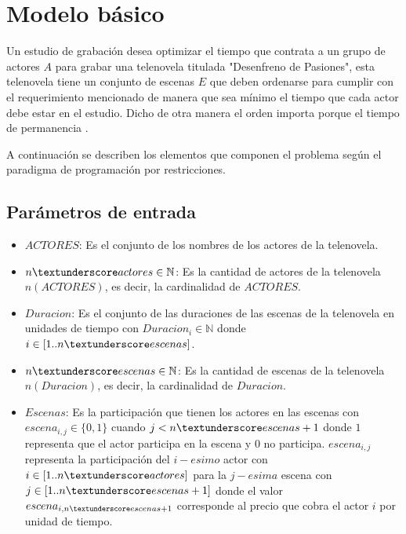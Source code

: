\documentclass{article}
\begin{document}

\section{Modelo básico}
Un estudio de grabación desea optimizar el tiempo que contrata a un grupo de actores $A$ para grabar una telenovela titulada "Desenfreno de Pasiones", esta telenovela tiene un conjunto de escenas $E$ que deben ordenarse para cumplir con el requerimiento mencionado de manera que sea mínimo el tiempo que cada actor debe estar en el estudio. Dicho de otra manera el orden importa porque el tiempo de permanencia . \newline

A continuación se describen los elementos que componen el problema según el paradigma de programación por restricciones.

\subsection{Parámetros de entrada}
\begin{itemize}
    \item $ACTORES$: Es el conjunto de los nombres de los actores de la telenovela.
    \item $n\textunderscore actores \in \mathbb{N}$: Es la cantidad de actores de la telenovela $n(ACTORES)$, es decir, la cardinalidad de $ACTORES$.
    \item $Duracion$: Es el conjunto de las duraciones de las escenas de la telenovela en unidades de tiempo con $Duracion_i \in \mathbb{N}$ donde $i \in [1..n\textunderscore escenas]$.
    \item $n\textunderscore escenas \in \mathbb{N}$: Es la cantidad de escenas de la telenovela $n(Duracion)$, es decir, la cardinalidad de $Duracion$.
    \item $Escenas$: Es la participación que tienen los actores en las escenas con $escena_{i,j} \in \{0,1\}$ cuando $j < n\textunderscore escenas + 1 $ donde  $1$ representa que el actor participa en la escena y $0$ no participa. $escena_{i,j}$ representa la participación del $i-esimo$ actor con $i \in [1..n\textunderscore actores]$ para la $j-esima$ escena con $j \in [1..n\textunderscore escenas + 1]$ donde el valor $escena_{i,n\textunderscore escenas + 1}$ corresponde al precio que cobra el actor $i$ por unidad de tiempo.
\end{itemize}
\end{document}
